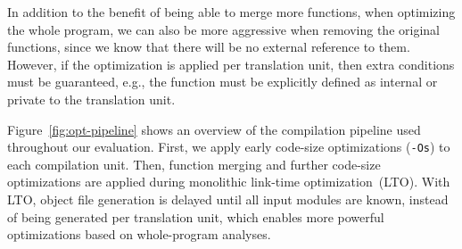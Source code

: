In addition to the benefit of being able to merge more functions, when optimizing
the whole program, we can also be more aggressive when removing the original functions,
since we know that there will be no external reference to them.
However, if the optimization is applied per translation unit, then extra
conditions must be guaranteed, e.g., the function must be explicitly defined
as internal or private to the translation unit.

Figure~\ref{fig:opt-pipeline} shows an overview of the compilation pipeline used
throughout our evaluation.
First, we apply early code-size optimizations (\texttt{-Os}) to each compilation
unit.
Then, function merging and further code-size optimizations are applied during
monolithic link-time optimization~(LTO).
With LTO, object file generation is delayed until all input modules are known,
instead of being generated per translation unit, which enables more powerful
optimizations based on whole-program analyses.
